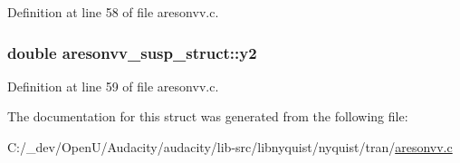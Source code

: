 Definition at line 58 of file aresonvv.\+c.

\subsubsection[{\texorpdfstring{y2}{y2}}]{\setlength{\rightskip}{0pt plus 5cm}double aresonvv\+\_\+susp\+\_\+struct\+::y2}\hypertarget{structaresonvv__susp__struct_a79325cd38a8a740a2498f09a9ed659bd}{}\label{structaresonvv__susp__struct_a79325cd38a8a740a2498f09a9ed659bd}


Definition at line 59 of file aresonvv.\+c.



The documentation for this struct was generated from the following file\+:\begin{DoxyCompactItemize}
\item 
C\+:/\+\_\+dev/\+Open\+U/\+Audacity/audacity/lib-\/src/libnyquist/nyquist/tran/\hyperlink{aresonvv_8c}{aresonvv.\+c}\end{DoxyCompactItemize}
